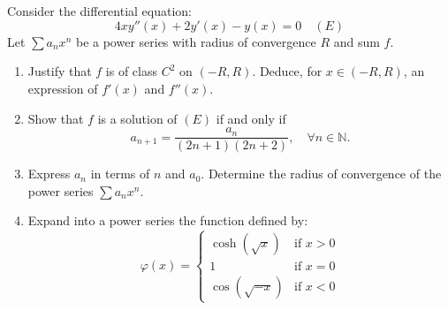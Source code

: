 \documentclass[12pt]{article}
\begin{document}
\section{}
Consider the differential equation:
\[
4x y''(x) + 2y'(x) - y(x) = 0 \quad (E)
\]
Let \( \sum a_n x^n \) be a power series with radius of convergence \( R \) and sum \( f \).

\begin{enumerate}
    \item Justify that \( f \) is of class \( C^2 \) on \( (-R, R) \). Deduce, for \( x \in (-R, R) \), an expression of \( f'(x) \) and \( f''(x) \).
    
    \item Show that \( f \) is a solution of \( (E) \) if and only if
    \[
    a_{n+1} = \frac{a_n}{(2n+1)(2n+2)}, \quad \forall n \in \mathbb{N}.
    \]
    
    \item Express \( a_n \) in terms of \( n \) and \( a_0 \). Determine the radius of convergence of the power series \( \sum a_n x^n \).
    
    \item Expand into a power series the function defined by:
    \[
    \varphi(x) = 
    \begin{cases}
    \cosh(\sqrt{x}) & \text{if } x > 0 \\
    1 & \text{if } x = 0 \\
    \cos(\sqrt{-x}) & \text{if } x < 0
    \end{cases}
    \]
\end{enumerate}
\end{document}
